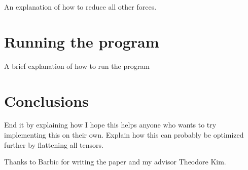 \documentclass[twocolumn,10pt]{asme2ej}
\begin{document}
An explanation of how to reduce all other forces.

\section{Running the program}

A brief explanation of how to run the program

\section{Conclusions}

End it by explaining how I hope this helps anyone who wants to try implementing this on their own.
Explain how this can probably be optimized further by flattening all tensors.

\begin{acknowledgment}

Thanks to Barbic for writing the paper and my advisor Theodore Kim.

\end{acknowledgment}

\end{document}
